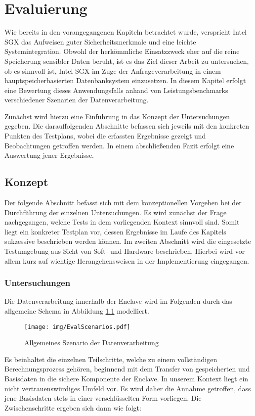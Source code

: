 \chapter{Evaluierung}

Wie bereits in den vorangegangenen Kapiteln betrachtet wurde, verspricht Intel SGX das Aufweisen guter Sicherheitsmerkmale und eine leichte Systemintegration. Obwohl der herkömmliche Einsatzzweck eher auf die reine Speicherung sensibler Daten beruht, ist es das Ziel dieser Arbeit zu untersuchen, ob es sinnvoll ist, Intel SGX im Zuge der Anfrageverarbeitung in einem hauptspeicherbasierten Datenbanksystem einzusetzen. In diesem Kapitel erfolgt eine Bewertung dieses Anwendungsfalls anhand von Leistungsbenchmarks verschiedener Szenarien der Datenverarbeitung.

Zunächst wird hierzu eine Einführung in das Konzept der Untersuchungen gegeben. Die darauffolgenden Abschnitte befassen sich jeweils mit den konkreten Punkten des Testplans, wobei die erfassten Ergebnisse gezeigt und Beobachtungen getroffen werden. In einem abschließenden Fazit erfolgt eine Auswertung jener Ergebnisse.

\section{Konzept}

Der folgende Abschnitt befasst sich mit dem konzeptionellen Vorgehen bei der Durchführung der einzelnen Untersuchungen. Es wird zunächst der Frage nachgegangen, welche Tests in dem vorliegenden Kontext sinnvoll sind. Somit liegt ein konkreter Testplan vor, dessen Ergebnisse im Laufe des Kapitels sukzessive beschrieben werden können. Im zweiten Abschnitt wird die eingesetzte Testumgebung aus Sicht von Soft- und Hardware beschrieben. Hierbei wird vor allem kurz auf wichtige Herangehensweisen in der Implementierung eingegangen.

\subsection{Untersuchungen}

Die Datenverarbeitung innerhalb der Enclave wird im Folgenden durch das allgemeine Schema in Abbildung \ref{fig:scenarios} modelliert.
\begin{figure}[h]
	\texttt{[image: img/EvalScenarios.pdf]}
	\centering
	\caption{Allgemeines Szenario der Datenverarbeitung}
	\label{fig:scenarios}
\end{figure} 
Es beinhaltet die einzelnen Teilschritte, welche zu einem vollständigen Berechnungsprozess gehören, beginnend mit dem Transfer von gespeicherten und Basisdaten in die sichere Komponente der Enclave. In unserem Kontext liegt ein nicht vertrauenswürdiges Umfeld vor. Es wird daher die Annahme getroffen, dass jene Basisdaten stets in einer verschlüsselten Form vorliegen. Die Zwischenschritte ergeben sich dann wie folgt:

